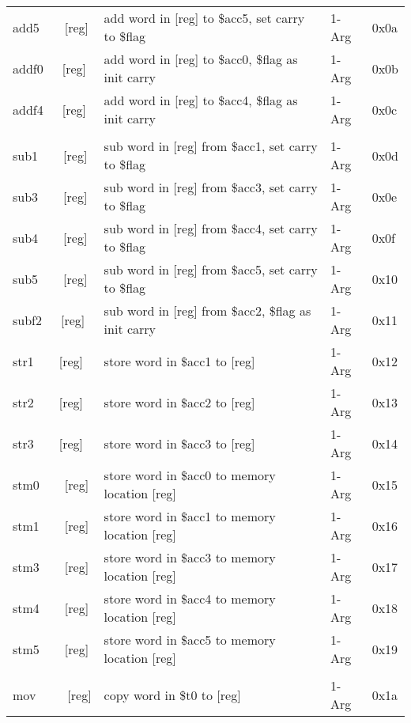 \documentclass{article}
\begin{document}
\begin{longtable}[c]{L{2.6cm}|L{9.5cm}|C{1.2cm}|C{1.2cm}}
      add5\ \ \ \ [reg]  & add word in [reg] to \$acc5, set carry to \$flag   & 1-Arg     & 0x0a \\
      addf0\ \ \ [reg]   & add word in [reg] to \$acc0, \$flag as init carry  & 1-Arg     & 0x0b \\
      addf4\ \ \ [reg]   & add word in [reg] to \$acc4, \$flag as init carry  & 1-Arg     & 0x0c \\
                         &                                                    &           &      \\
      sub1\ \ \ \ [reg]  & sub word in [reg] from \$acc1, set carry to \$flag & 1-Arg     & 0x0d \\
      sub3\ \ \ \ [reg]  & sub word in [reg] from \$acc3, set carry to \$flag & 1-Arg     & 0x0e \\
      sub4\ \ \ \ [reg]  & sub word in [reg] from \$acc4, set carry to \$flag & 1-Arg     & 0x0f \\
      sub5\ \ \ \ [reg]  & sub word in [reg] from \$acc5, set carry to \$flag & 1-Arg     & 0x10 \\
      subf2\ \ \ [reg]   & sub word in [reg] from \$acc2, \$flag as init carry& 1-Arg     & 0x11 \\
      str1\ \ \ \ [reg]  & store word in \$acc1 to [reg]                      & 1-Arg     & 0x12 \\
      str2\ \ \ \ [reg]  & store word in \$acc2 to [reg]                      & 1-Arg     & 0x13 \\
      str3\ \ \ \ [reg]  & store word in \$acc3 to [reg]                      & 1-Arg     & 0x14 \\
      stm0\ \ \ \ [reg]  & store word in \$acc0 to memory location [reg]      & 1-Arg     & 0x15 \\
      stm1\ \ \ \ [reg]  & store word in \$acc1 to memory location [reg]      & 1-Arg     & 0x16 \\
      stm3\ \ \ \ [reg]  & store word in \$acc3 to memory location [reg]      & 1-Arg     & 0x17 \\
      stm4\ \ \ \ [reg]  & store word in \$acc4 to memory location [reg]      & 1-Arg     & 0x18 \\
      stm5\ \ \ \ [reg]  & store word in \$acc5 to memory location [reg]      & 1-Arg     & 0x19 \\
                         &                                                    &           &      \\
      mov\ \ \ \ \ [reg] & copy word in \$t0 to [reg]                         & 1-Arg     & 0x1a \\

\end{longtable}
\end{document}
